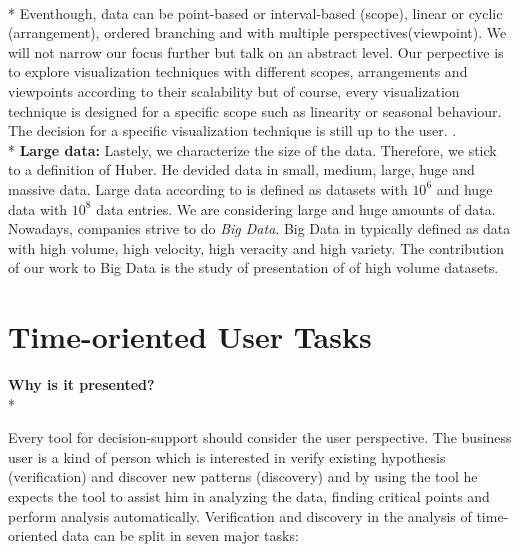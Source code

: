 \\*
Eventhough, data can be point-based or interval-based (scope), linear or cyclic (arrangement), ordered branching and with multiple perspectives(viewpoint)\cite{Aigner2011}. We will not narrow our focus further but talk on an abstract level. Our perpective is to explore visualization techniques with different scopes, arrangements and viewpoints according to their scalability but of course, every visualization technique is designed for a specific scope such as linearity or seasonal behaviour. The decision for a specific visualization technique is still up to the user. .\\*
\textbf{Large data:} Lastely, we characterize the size of the data. Therefore, we stick to a definition of Huber. He devided data in small, medium, large, huge and massive data. Large data according to\cite{Huber1994} is defined as datasets with $10^6$ and huge data with $10^8$ data entries. We are considering large and huge amounts of data. Nowadays, companies strive to do \textit{Big Data}. Big Data in typically defined as data with  high volume, high velocity, high veracity and high variety\cite{Wang2015}. The contribution of our work to Big Data is the study of presentation of of high volume datasets.



\section{Time-oriented User Tasks} \label{tasks}
\textbf{Why is it presented?}\\*

Every tool for decision-support should consider the user perspective. The business user is a kind of person which is interested in verify existing hypothesis (verification) and discover new patterns (discovery) and by using the tool he expects the tool to assist him in analyzing the data, finding critical points and perform analysis automatically\cite{Brachman1996}. Verification and discovery in the analysis of time-oriented data can be split in seven major tasks\cite{Esling2012}:

